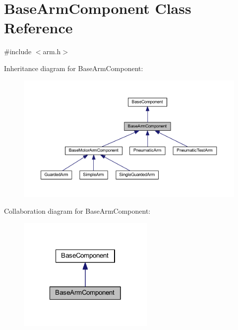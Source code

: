 \hypertarget{class_base_arm_component}{\section{\-Base\-Arm\-Component \-Class \-Reference}
\label{class_base_arm_component}
}


{\ttfamily \#include $<$arm.\-h$>$}



\-Inheritance diagram for \-Base\-Arm\-Component\-:\nopagebreak
\begin{figure}[H]
\begin{center}
\leavevmode
\includegraphics[width=350pt]{class_base_arm_component__inherit__graph}
\end{center}
\end{figure}


\-Collaboration diagram for \-Base\-Arm\-Component\-:\nopagebreak
\begin{figure}[H]
\begin{center}
\leavevmode
\includegraphics[width=186pt]{class_base_arm_component__coll__graph}
\end{center}
\end{figure}
